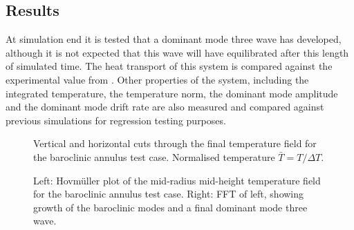 \subsection{Results}

At simulation end it is tested that a dominant mode three wave has developed,
although it is not expected that this wave will have equilibrated after this
length of simulated time. The heat transport of this system is compared against
the experimental value from \citet{read2003}. Other properties of the system,
including the integrated temperature, the temperature \Ltwo norm, the dominant
mode amplitude and the dominant mode drift rate are also measured and compared
against previous simulations for regression testing purposes.

\begin{figure}[ht]
  \centering
  \caption{Vertical and horizontal cuts through the final temperature field
           for the baroclinic annulus test case. Normalised temperature
           $\bar{T} = T / \Delta T$.}
\end{figure}

\begin{figure}[ht]
  \centering
  \caption{Left: Hovm\"uller plot of the mid-radius mid-height temperature field
           for the baroclinic annulus test case. Right: FFT of left, showing
           growth of the baroclinic modes and a final dominant mode three wave.}
\end{figure}

